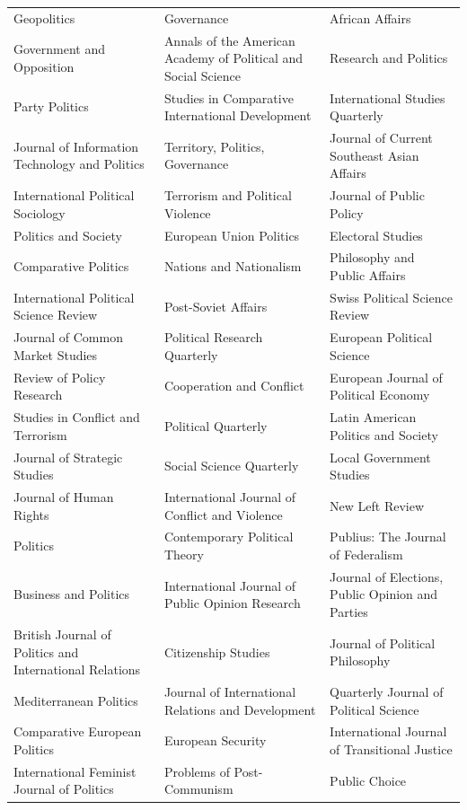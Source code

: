 \documentclass[12pt]{article}
\begin{document}
\begin{longtable}{p{}p{}p{}}
Geopolitics & Governance & African Affairs \\
Government and Opposition & Annals of the American Academy of Political and Social Science & Research and Politics \\
Party Politics & Studies in Comparative International Development & International Studies Quarterly \\
Journal of Information Technology and Politics & Territory, Politics, Governance & Journal of Current Southeast Asian Affairs \\
International Political Sociology & Terrorism and Political Violence & Journal of Public Policy \\
Politics and Society & European Union Politics & Electoral Studies \\
Comparative Politics & Nations and Nationalism & Philosophy and Public Affairs \\
International Political Science Review & Post-Soviet Affairs & Swiss Political Science Review \\
Journal of Common Market Studies & Political Research Quarterly & European Political Science \\
Review of Policy Research & Cooperation and Conflict & European Journal of Political Economy \\
Studies in Conflict and Terrorism & Political Quarterly & Latin American Politics and Society \\
Journal of Strategic Studies & Social Science Quarterly & Local Government Studies \\
Journal of Human Rights & International Journal of Conflict and Violence & New Left Review \\
Politics & Contemporary Political Theory & Publius: The Journal of Federalism \\
Business and Politics & International Journal of Public Opinion Research & Journal of Elections, Public Opinion and Parties \\
British Journal of Politics and International Relations & Citizenship Studies & Journal of Political Philosophy \\
Mediterranean Politics & Journal of International Relations and Development & Quarterly Journal of Political Science \\
Comparative European Politics & European Security & International Journal of Transitional Justice \\
International Feminist Journal of Politics & Problems of Post-Communism & Public Choice \\

\end{longtable}
\end{document}
